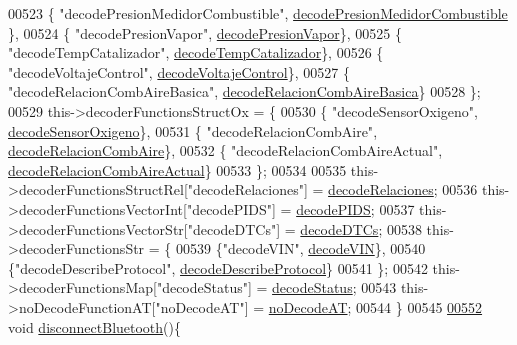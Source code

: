\begin{DoxyCode}
{{{{{{{{{{{{{{00523             \{ \textcolor{stringliteral}{"decodePresionMedidorCombustible"}, \hyperlink{decoders_8cpp_a228605d8cad0901a691ba4155a2326fc}{decodePresionMedidorCombustible}
      \},
00524             \{ \textcolor{stringliteral}{"decodePresionVapor"}, \hyperlink{decoders_8cpp_ab86bda1fcefda784e048796e2d892475}{decodePresionVapor}\},
00525             \{ \textcolor{stringliteral}{"decodeTempCatalizador"}, \hyperlink{decoders_8cpp_a8251853ca2e5b8b2e88c75f50d53bc8d}{decodeTempCatalizador}\},
00526             \{ \textcolor{stringliteral}{"decodeVoltajeControl"}, \hyperlink{decoders_8cpp_a5937fc059394faad8c9c96a0b27a8796}{decodeVoltajeControl}\},
00527             \{ \textcolor{stringliteral}{"decodeRelacionCombAireBasica"}, \hyperlink{decoders_8cpp_ade77bb9f8d8a2ba3aa431cdf9bdd0c32}{decodeRelacionCombAireBasica}\}
00528         \};
00529         this->decoderFunctionsStructOx = \{
00530             \{ \textcolor{stringliteral}{"decodeSensorOxigeno"}, \hyperlink{decoders_8cpp_a5b53fc5fc37fbee9c5e389f6c8c18438}{decodeSensorOxigeno}\},
00531             \{ \textcolor{stringliteral}{"decodeRelacionCombAire"}, \hyperlink{decoders_8cpp_a363bd4f505969098be58a175f02b9b50}{decodeRelacionCombAire}\},
00532             \{ \textcolor{stringliteral}{"decodeRelacionCombAireActual"}, \hyperlink{decoders_8cpp_a4cedb500095b25b3d4fff382094b0eb9}{decodeRelacionCombAireActual}\}
00533         \};
00534 
00535         this->decoderFunctionsStructRel[\textcolor{stringliteral}{"decodeRelaciones"}] = \hyperlink{decoders_8cpp_a88d7079325bf81705583d9f2101cfa15}{decodeRelaciones};
00536         this->decoderFunctionsVectorInt[\textcolor{stringliteral}{"decodePIDS"}] = \hyperlink{decoders_8cpp_aef44cca306ed9c74b146d2b7dd058763}{decodePIDS};
00537         this->decoderFunctionsVectorStr[\textcolor{stringliteral}{"decodeDTCs"}] = \hyperlink{decoders_8cpp_aac9b3d4ea17ee4dbbdf755b0b510137a}{decodeDTCs};
00538         this->decoderFunctionsStr = \{
00539             \{\textcolor{stringliteral}{"decodeVIN"}, \hyperlink{decoders_8cpp_a66754738119854c13a74265e209083e4}{decodeVIN}\},
00540             \{\textcolor{stringliteral}{"decodeDescribeProtocol"}, \hyperlink{decoders_8cpp_ab83ce79cd098ea655f3812488e304a0c}{decodeDescribeProtocol}\}
00541         \};
00542         this->decoderFunctionsMap[\textcolor{stringliteral}{"decodeStatus"}] = \hyperlink{decoders_8cpp_aca9cad863d8603615597a0291804c8ae}{decodeStatus};
00543         this->noDecodeFunctionAT[\textcolor{stringliteral}{"noDecodeAT"}] = \hyperlink{decoders_8cpp_a8ee851a37675f190ea728d6b2f0cdc92}{noDecodeAT};
00544     \}
00545 
\hyperlink{classObd_a95d02f8f3c48557c5ad799ecb6dd7f79}{00552}     \textcolor{keywordtype}{void} \hyperlink{classObd_a95d02f8f3c48557c5ad799ecb6dd7f79}{disconnectBluetooth}()\{
}}}}}}}}}}}}}}
\end{DoxyCode}
